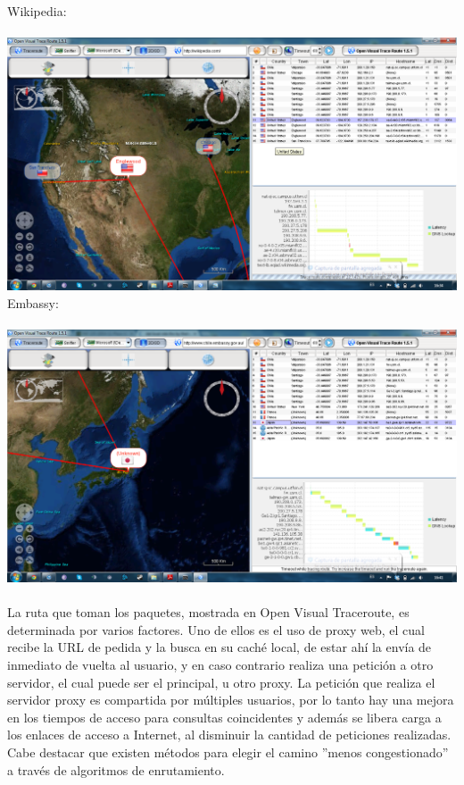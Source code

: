 \documentclass[paper=a4, fontsize=11pt]{scrartcl}
\numberwithin{equation}{section}		%
\numberwithin{figure}{section}			%
\numberwithin{table}{section}				%
\begin{document}
Wikipedia:\\\\
\includegraphics[width=1\textwidth]{wikipedia.png}
\clearpage
Embassy:\\\\
\includegraphics[width=1\textwidth]{embassy.png}\\\\

La ruta que toman los paquetes, mostrada en Open Visual Traceroute, es determinada por varios factores. Uno de ellos es el uso de proxy web, el cual recibe la URL de pedida y la busca en su caché local, de estar ahí la envía de inmediato de vuelta al usuario, y en caso contrario realiza una petición a otro servidor, el cual puede ser el principal, u otro proxy. La petición que realiza el servidor proxy es compartida por múltiples usuarios, por lo tanto hay una mejora en los tiempos de acceso para consultas coincidentes y además se libera carga a los enlaces de acceso a Internet, al disminuir la cantidad de peticiones realizadas.
Cabe destacar que existen métodos para elegir el camino ''menos congestionado'' a través de algoritmos de enrutamiento.
\end{document}
